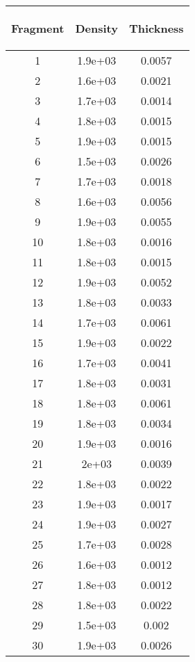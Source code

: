 \begin{tabularx}{0.45\textwidth}{c|c|c}
\begin{sideways}\textbf{Fragment}\end{sideways} & \begin{sideways}\textbf{Density}\end{sideways} & \begin{sideways}\textbf{Thickness}\end{sideways}\\ \hline
1 & 1.9e+03 & 0.0057\\ \hline
2 & 1.6e+03 & 0.0021\\ \hline
3 & 1.7e+03 & 0.0014\\ \hline
4 & 1.8e+03 & 0.0015\\ \hline
5 & 1.9e+03 & 0.0015\\ \hline
6 & 1.5e+03 & 0.0026\\ \hline
7 & 1.7e+03 & 0.0018\\ \hline
8 & 1.6e+03 & 0.0056\\ \hline
9 & 1.9e+03 & 0.0055\\ \hline
10 & 1.8e+03 & 0.0016\\ \hline
11 & 1.8e+03 & 0.0015\\ \hline
12 & 1.9e+03 & 0.0052\\ \hline
13 & 1.8e+03 & 0.0033\\ \hline
14 & 1.7e+03 & 0.0061\\ \hline
15 & 1.9e+03 & 0.0022\\ \hline
16 & 1.7e+03 & 0.0041\\ \hline
17 & 1.8e+03 & 0.0031\\ \hline
18 & 1.8e+03 & 0.0061\\ \hline
19 & 1.8e+03 & 0.0034\\ \hline
20 & 1.9e+03 & 0.0016\\ \hline
21 & 2e+03 & 0.0039\\ \hline
22 & 1.8e+03 & 0.0022\\ \hline
23 & 1.9e+03 & 0.0017\\ \hline
24 & 1.9e+03 & 0.0027\\ \hline
25 & 1.7e+03 & 0.0028\\ \hline
26 & 1.6e+03 & 0.0012\\ \hline
27 & 1.8e+03 & 0.0012\\ \hline
28 & 1.8e+03 & 0.0022\\ \hline
29 & 1.5e+03 & 0.002\\ \hline
30 & 1.9e+03 & 0.0026\\ \hline

\end{tabularx}
